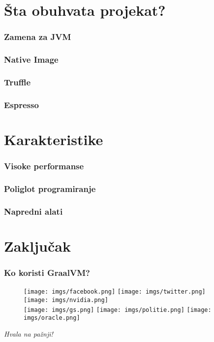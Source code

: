 \documentclass{beamer}
\begin{document}
	\section{Šta obuhvata projekat?}
	
	\begin{frame}
		\frametitle{Zamena za JVM}
	\end{frame}	
	
	\begin{frame}
		\frametitle{Native Image}
	\end{frame}	
	
	
	\begin{frame}
		\frametitle{Truffle}
	\end{frame}	

	\begin{frame}
		\frametitle{Espresso}
	\end{frame}	
	
		
	\section{Karakteristike}
	
	\begin{frame}
		\frametitle{Visoke performanse}
	\end{frame}	

	\begin{frame}
		\frametitle{Poliglot programiranje}
	\end{frame}	

	\begin{frame}
		\frametitle{Napredni alati}
	\end{frame}	

	\section{Zaključak}
	
	\begin{frame}
		\frametitle{Ko koristi GraalVM?}
		\begin{figure}
			\texttt{[image: imgs/facebook.png]}
			\texttt{[image: imgs/twitter.png]} 
			\texttt{[image: imgs/nvidia.png]} \\
			\texttt{[image: imgs/gs.png]}
			\texttt{[image: imgs/politie.png]}
			\texttt{[image: imgs/oracle.png]}
		\end{figure}
	\end{frame}
	
	\begin{frame}
		\center	
		\textit{Hvala na pažnji!}
	\end{frame}

	\begin{frame}
		\nocite{*}
		 
		
	\end{frame}
	
\end{document}
